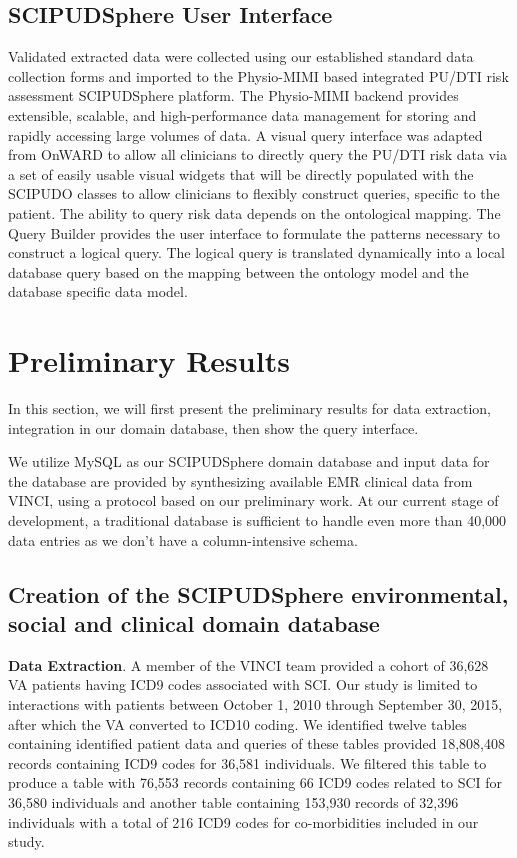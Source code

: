 \documentclass{amia}
\begin{document}
\subsection{SCIPUDSphere User Interface}
Validated extracted data were collected using our established standard data collection forms and imported to the Physio-MIMI based integrated PU/DTI risk assessment SCIPUDSphere platform. The Physio-MIMI backend provides extensible, scalable, and high-performance data management for storing and rapidly accessing large volumes of data. A visual query interface was adapted from OnWARD to allow all clinicians to directly query the PU/DTI risk data via a set of easily usable visual widgets that will be directly populated with the SCIPUDO classes to allow clinicians to flexibly construct queries, specific to the patient. The ability to query risk data depends on the ontological mapping. The Query Builder provides the user interface to formulate the patterns necessary to construct a logical query. The logical query is translated dynamically into a local database query based on the mapping between the ontology model and the database specific data model.

\section{Preliminary Results}
In this section, we will first present the preliminary results for data extraction, integration in our domain database, then show the query interface. 

We utilize MySQL as our SCIPUDSphere domain database and input data for the database are provided by synthesizing available EMR clinical data from VINCI, using a protocol based on our preliminary work. At our current stage of development, a traditional database is sufficient to handle even more than 40,000 data entries as we don't have a column-intensive schema.

\subsection{Creation of the SCIPUDSphere environmental, social and clinical domain database}
{\bf Data Extraction}. A member of the VINCI team provided a cohort of 36,628 VA patients having ICD9 codes associated with SCI. Our study is limited to interactions with patients between October 1, 2010 through September 30, 2015, after which the VA converted to ICD10 coding. We identified twelve tables containing identified patient data and queries of these tables provided 18,808,408 records containing ICD9 codes for 36,581 individuals.  We filtered this table to produce a table with 76,553 records containing 66 ICD9 codes related to SCI for 36,580 individuals and another table containing 153,930 records of 32,396 individuals with a total of 216 ICD9 codes for co-morbidities included in our study.
\end{document}
